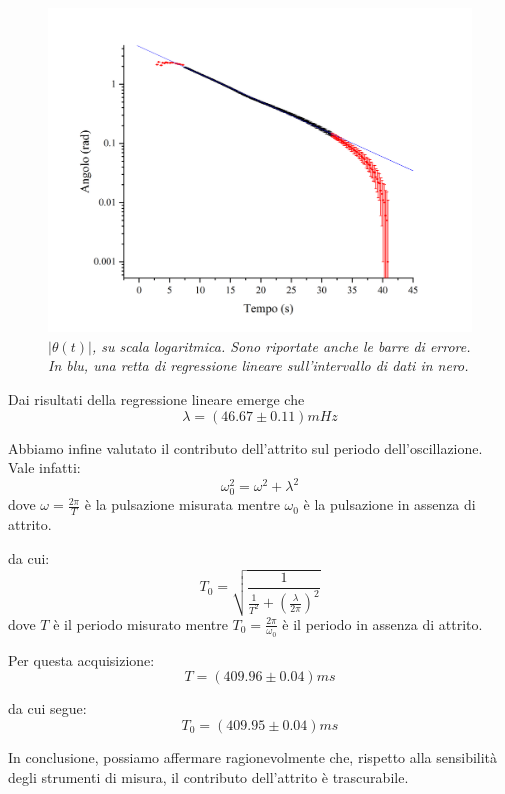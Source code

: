 \documentclass{article}
\begin{document}
\begin{center}
    \begin{figure}[H]
        \includegraphics[trim={2cm 1cm 2cm 2.1cm},clip,width=\textwidth]{img/Exp4.jpg}
        \caption[]{\emph{
            $\left|\theta(t)\right|$, su scala logaritmica.
            Sono riportate anche le barre di errore.
            In blu, una retta di regressione lineare
            sull'intervallo di dati in nero.
        }}
    \end{figure}
\end{center}

Dai risultati della regressione lineare emerge che
\[\lambda = \left(46.67\pm0.11\right)\unit{mHz}\]

Abbiamo infine valutato il contributo dell'attrito sul periodo
dell'oscillazione. Vale infatti:
\[\omega_0^2 = \omega^2 + \lambda^2\]
dove $\omega=\frac{2\pi}{T}$ è la pulsazione misurata
mentre $\omega_0$ è la pulsazione in assenza di attrito.

da cui:
\[T_0 = \sqrt{\frac{1}{\frac{1}{T^2} + \left(\frac{\lambda}{2\pi}\right)^2}}\]
dove $T$ è il periodo misurato mentre
$T_0=\frac{2\pi}{\omega_0}$ è il periodo in assenza di attrito.

Per questa acquisizione:
\[T = \left(409.96\pm0.04\right)\unit{ms}\]

da cui segue:
\[T_0=\left(409.95\pm0.04\right)\unit{ms}\]

In conclusione, possiamo affermare ragionevolmente che,
rispetto alla sensibilità degli strumenti di misura,
il contributo dell'attrito è trascurabile.
\end{document}

